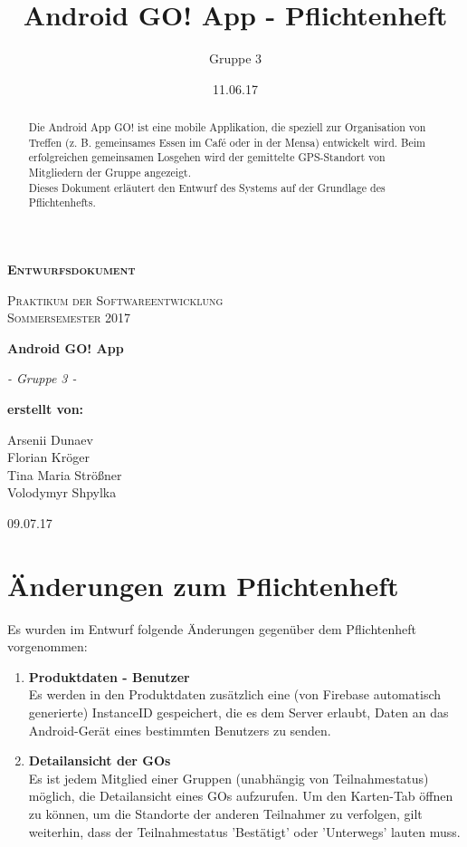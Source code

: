 \documentclass[parskip=full]{scrartcl}
\title{Android GO! App - Pflichtenheft}
\author{Gruppe 3}
\date{11.06.17}
\begin{document}
\begin{titlepage}
	\begin{center}
	{\scshape\LARGE \bfseries Entwurfsdokument \par}
	\vspace{1cm}
	{\scshape\Large Praktikum der Softwareentwicklung \\ Sommersemester 2017\par}
	\vspace{1.5cm}
	{\huge\bfseries Android GO! App\par}
	\vspace{2cm}
	{\Large\itshape - Gruppe 3 -\par}
	\vfill
	{\bfseries erstellt von:\par}
	Arsenii Dunaev \\
	Florian Kröger \\
	Tina Maria Strößner \\
	Volodymyr Shpylka \\	
	\vfill
	{\large 09.07.17 \par}	
	\end{center}
\end{titlepage}

\newpage

\begin{abstract}
Die Android App GO! ist eine mobile Applikation, die speziell zur Organisation von Treffen (z. B. gemeinsames Essen im Café oder in der Mensa) entwickelt wird. Beim erfolgreichen gemeinsamen Losgehen wird der gemittelte GPS-Standort von Mitgliedern der Gruppe angezeigt.\\

Dieses Dokument erläutert den Entwurf des Systems auf der Grundlage des Pflichtenhefts.
\end{abstract}

\newpage

\tableofcontents

\newpage

\section{Änderungen zum Pflichtenheft}

Es wurden im Entwurf folgende Änderungen gegenüber dem Pflichtenheft vorgenommen:
\begin{enumerate}
	\item \textbf{Produktdaten - Benutzer} \\
	Es werden in den Produktdaten zusätzlich eine (von Firebase automatisch generierte) InstanceID gespeichert, die es dem Server erlaubt, Daten an das Android-Gerät eines bestimmten Benutzers zu senden.
	\item \textbf{Detailansicht der GOs} \\
	Es ist jedem Mitglied einer Gruppen (unabhängig von Teilnahmestatus) möglich, die Detailansicht eines GOs aufzurufen. Um den Karten-Tab öffnen zu können, um die Standorte der anderen Teilnahmer zu verfolgen, gilt weiterhin, dass der Teilnahmestatus 'Bestätigt' oder 'Unterwegs' lauten muss.
\end{enumerate}
\end{document}
